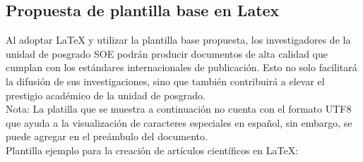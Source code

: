 \documentclass[10pt,twocolumn,a4paper]{article}
\begin{document}
    \subsection{Propuesta de plantilla base en Latex}
    Al adoptar LaTeX y utilizar la plantilla base propuesta, los investigadores de la unidad de posgrado SOE podrán producir documentos de alta calidad que cumplan con los estándares internacionales de publicación. 
    Esto no solo facilitará la difusión de sus investigaciones, sino que también contribuirá a elevar el prestigio académico de la unidad de posgrado.\\
    Nota: La platilla que se muestra a continuación no cuenta con el formato UTF8 que ayuda a la visualización de caracteres especiales en español, sin embargo, se puede agregar en el preámbulo del documento.\\
    Plantilla ejemplo para la creación de artículos científicos en LaTeX:
\end{document}
